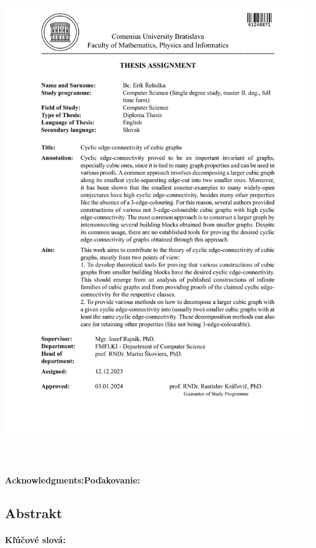 \documentclass[12pt, twoside]{book}
\begin{document}
    \noindent
    \includegraphics[trim=2.5cm 5cm 2.5cm 0,width=\textwidth]{images/assignment-en.pdf}
\fi

\newpage

~\vfill
\paragraph*{\ifenglish{}Acknowledgments:\else{}Poďakovanie:\fi} \thesisacknowledgments{}

\newpage

\begin{otherlanguage}{slovak}
    \section*{Abstrakt}

    \thesisabstractsk{}

    \paragraph*{Kľúčové slová:} \thesiskeywordssk{}
\end{otherlanguage}
\end{document}
